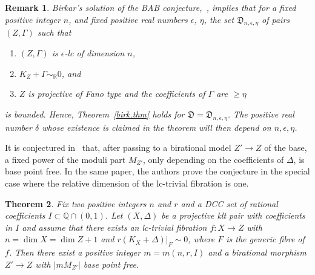 \documentclass{amsart}[12pt,a4paper]
\newtheorem{theorem}{Theorem}[section]
\newtheorem{remark}[theorem]{Remark}
\theoremstyle{definition}
\newcommand{\rr}{\mathbb{R}}
\begin{document}
\begin{remark}
\label{rmk.bab.sing.base}
Birkar's solution of the BAB conjecture,~\cite{bab16a, bir16bab}, implies that for a fixed positive integer $n$, and fixed positive real numbers $\epsilon$, $\eta$,  the set $\mathfrak{D}_{n, \epsilon, \eta}$ of pairs $(Z, \Gamma)$ such that
\begin{enumerate}
\item[(i)] $(Z,\Gamma)$ is $\epsilon$-lc of dimension $n$,
\item[(ii)] $K_Z+\Gamma \sim_{\rr} 0$, and
\item[(iii)] $Z$ is projective of Fano type and the coefficients of $\Gamma$ are $\geq \eta$
\end{enumerate}
is bounded. 
Hence, Theorem~\ref{birk.thm} holds for $\mathfrak{D}=\mathfrak{D}_{n, \epsilon, \eta}$.
The positive real number $\delta$ whose existence is claimed in the theorem will then depend on $n, \epsilon, \eta$.
\end{remark}

It is conjectured in~\cite{PS} that, after passing to a birational model $Z' \to Z$ of the base, a fixed power of the moduli part $M_{Z'}$, only depending on the coefficients of $\Delta$, is base point free. 
In the same paper, the authors prove the conjecture in the special case where the relative dimension of the lc-trivial fibration is one.

\begin{theorem}
\cite[Theorem~8.1]{PS}
\label{semiample}
Fix two positive integers $n$ and $r$ and a DCC set of rational coefficients $I \subset \mathbb{Q} \cap (0,1)$. \newline
Let $(X, \Delta)$ be a projective klt pair with coefficients in $I$ and assume that there exists an lc-trivial fibration $f\colon X \rightarrow Z$ with $n=\dim X =\dim Z +1$  and $r(K_X+\Delta)|_F \sim 0$, where $F$ is the generic fibre of $f$.\newline
Then there exist a positive integer $m=m(n,r, I)$ and a birational morphism $Z' \rightarrow Z$ with $|mM_{Z'}|$ base point free. 
\end{theorem} 
\end{document}
